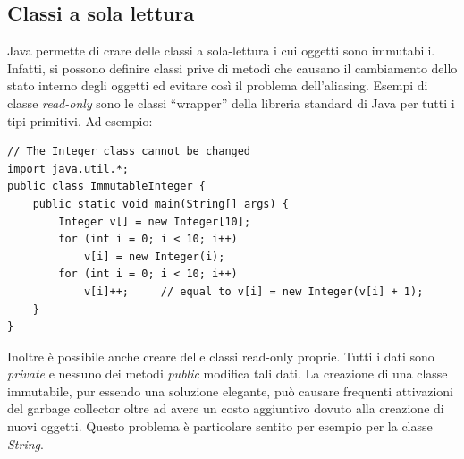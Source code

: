 \documentclass[12pt]{report}
\begin{document}
\subsection{Classi a sola lettura}
Java permette di crare delle classi a sola-lettura i cui oggetti sono immutabili. Infatti, si possono definire classi prive di metodi che causano il cambiamento dello stato interno degli oggetti ed evitare così il problema dell'aliasing. Esempi di classe \textit{read-only} sono le classi ``wrapper'' della libreria standard di Java per tutti i tipi primitivi.
Ad esempio:
\begin{lstlisting}[style=javastyle]
// The Integer class cannot be changed
import java.util.*;
public class ImmutableInteger {
	public static void main(String[] args) {
		Integer v[] = new Integer[10];
		for (int i = 0; i < 10; i++)
			v[i] = new Integer(i);
		for (int i = 0; i < 10; i++)
			v[i]++;		// equal to v[i] = new Integer(v[i] + 1);
	}
}
\end{lstlisting}
	Inoltre è possibile anche creare delle classi read-only proprie. Tutti i dati sono \textit{private} e nessuno dei metodi \textit{public} modifica tali dati. La creazione di una classe immutabile, pur essendo una soluzione elegante, può causare frequenti attivazioni del garbage collector oltre ad avere un costo aggiuntivo dovuto alla creazione di nuovi oggetti. Questo problema è particolare sentito per esempio per la classe \textit{String}.
\end{document}
